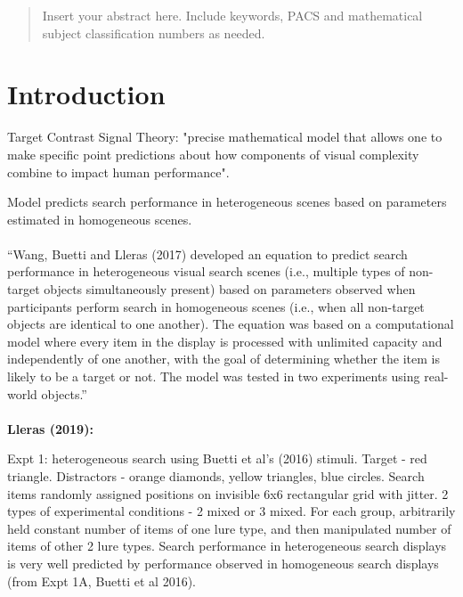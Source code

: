 \date{Received: date / Accepted: date}

\maketitle

\begin{abstract}
Insert your abstract here. Include keywords, PACS and mathematical
subject classification numbers as needed.
\end{abstract}

\section{Introduction}
\label{intro}

Target Contrast Signal Theory: "precise mathematical model that allows one to make specific point predictions about how components of visual complexity combine to impact human performance".

Model predicts search performance in heterogeneous scenes based on parameters estimated in homogeneous scenes. 


\paragraph{}

``Wang, Buetti and Lleras (2017) developed an equation to predict search performance in heterogeneous visual search scenes (i.e., multiple types of non-target objects simultaneously present) based on parameters observed when participants perform search in homogeneous scenes (i.e., when all non-target objects are identical to one another). The equation was based on a computational model where every item in the display is processed with unlimited capacity and independently of one another, with the goal of determining whether the item is likely to be a target or not. The model was tested in two experiments using real-world objects.''

\paragraph{}

\textbf{Lleras (2019):}

Expt 1: heterogeneous search using Buetti et al's (2016) stimuli.
Target - red triangle.
Distractors - orange diamonds, yellow triangles, blue circles.
Search items randomly assigned positions on invisible 6x6 rectangular grid with jitter. 2 types of experimental conditions - 2 mixed or 3 mixed. For each group, arbitrarily held constant number of items of one lure type, and then manipulated number of items of other 2 lure types.
Search performance in heterogeneous search displays is very well predicted by performance observed in homogeneous search displays (from Expt 1A, Buetti et al 2016).


